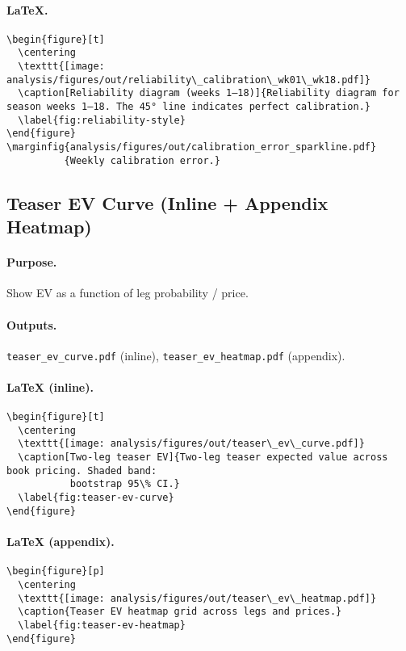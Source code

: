 \paragraph{LaTeX.}
\begin{verbatim}
\begin{figure}[t]
  \centering
  \texttt{[image: analysis/figures/out/reliability\_calibration\_wk01\_wk18.pdf]}
  \caption[Reliability diagram (weeks 1–18)]{Reliability diagram for season weeks 1–18. The 45° line indicates perfect calibration.}
  \label{fig:reliability-style}
\end{figure}
\marginfig{analysis/figures/out/calibration_error_sparkline.pdf}
          {Weekly calibration error.}
\end{verbatim}

\subsection{Teaser EV Curve (Inline + Appendix Heatmap)}
\paragraph{Purpose.} Show EV as a function of leg probability / price.
\paragraph{Outputs.} \texttt{teaser\_ev\_curve.pdf} (inline), \texttt{teaser\_ev\_heatmap.pdf} (appendix).
\paragraph{LaTeX (inline).}
\begin{verbatim}
\begin{figure}[t]
  \centering
  \texttt{[image: analysis/figures/out/teaser\_ev\_curve.pdf]}
  \caption[Two-leg teaser EV]{Two-leg teaser expected value across book pricing. Shaded band:
           bootstrap 95\% CI.}
  \label{fig:teaser-ev-curve}
\end{figure}
\end{verbatim}
\paragraph{LaTeX (appendix).}
\begin{verbatim}
\begin{figure}[p]
  \centering
  \texttt{[image: analysis/figures/out/teaser\_ev\_heatmap.pdf]}
  \caption{Teaser EV heatmap grid across legs and prices.}
  \label{fig:teaser-ev-heatmap}
\end{figure}
\end{verbatim}

